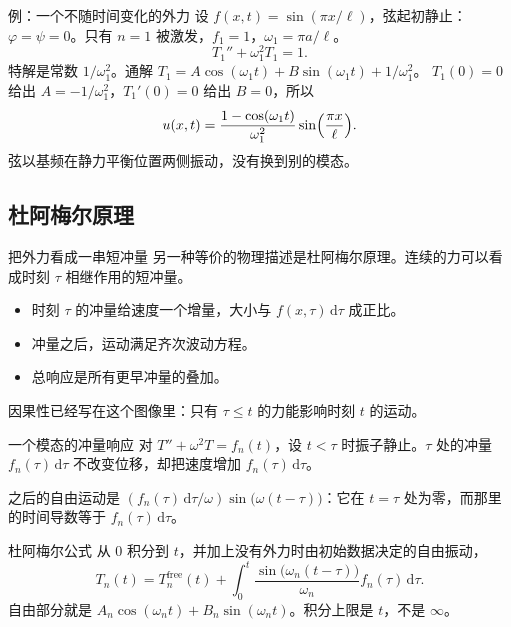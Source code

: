 \documentclass[fontset=windows, chinese, 10pt, xcolor=dvipsnames]{beamer}
\begin{document}
\begin{frame}{例：一个不随时间变化的外力}
  设 $f(x,t)=\sin(\pi x/\ell)$，弦起初静止：$\varphi=\psi=0$。只有 $n=1$ 被激发，$f_1=1$，$\omega_1=\pi a/\ell$。
  \begin{equation*}
    T_1''+\omega_1^2 T_1=1.
  \end{equation*}
  特解是常数 $1/\omega_1^2$。通解 $T_1=A\cos(\omega_1 t)+B\sin(\omega_1 t)+1/\omega_1^2$。
  $T_1(0)=0$ 给出 $A=-1/\omega_1^2$，$T_1'(0)=0$ 给出 $B=0$，所以
  \begin{equation*}
    u(x,t)=\frac{1-\cos(\omega_1 t)}{\omega_1^2}
      \sin\Bigl(\frac{\pi x}{\ell}\Bigr).
  \end{equation*}
  弦以基频在静力平衡位置两侧振动，没有换到别的模态。
\end{frame}

\subsection{杜阿梅尔原理}

\begin{frame}{把外力看成一串短冲量}
  另一种等价的物理描述是杜阿梅尔原理。连续的力可以看成时刻 $\tau$ 相继作用的短冲量。
  \begin{itemize}
    \item 时刻 $\tau$ 的冲量给速度一个增量，大小与 $f(x,\tau)\,\mathrm{d}\tau$ 成正比。
    \item 冲量之后，运动满足齐次波动方程。
    \item 总响应是所有更早冲量的叠加。
  \end{itemize}
  因果性已经写在这个图像里：只有 $\tau\leq t$ 的力能影响时刻 $t$ 的运动。
\end{frame}

\begin{frame}{一个模态的冲量响应}
  对 $T''+\omega^2 T=f_n(t)$，设 $t<\tau$ 时振子静止。$\tau$ 处的冲量 $f_n(\tau)\,\mathrm{d}\tau$ 不改变位移，却把速度增加 $f_n(\tau)\,\mathrm{d}\tau$。
  \vspace{0.3em}

  之后的自由运动是 $(f_n(\tau)\,\mathrm{d}\tau/\omega)\sin\bigl(\omega(t-\tau)\bigr)$：它在 $t=\tau$ 处为零，而那里的时间导数等于 $f_n(\tau)\,\mathrm{d}\tau$。
\end{frame}

\begin{frame}{杜阿梅尔公式}
  从 $0$ 积分到 $t$，并加上没有外力时由初始数据决定的自由振动，
  \begin{equation*}
    \boxed{
    T_n(t)=T_n^{\mathrm{free}}(t)
    +\int_0^{t}
      \frac{\sin\bigl(\omega_n(t-\tau)\bigr)}{\omega_n}
      f_n(\tau)\,\mathrm{d}\tau.}
  \end{equation*}
  自由部分就是 $A_n\cos(\omega_n t)+B_n\sin(\omega_n t)$。积分上限是 $t$，不是 $\infty$。
\end{frame}
\end{document}
